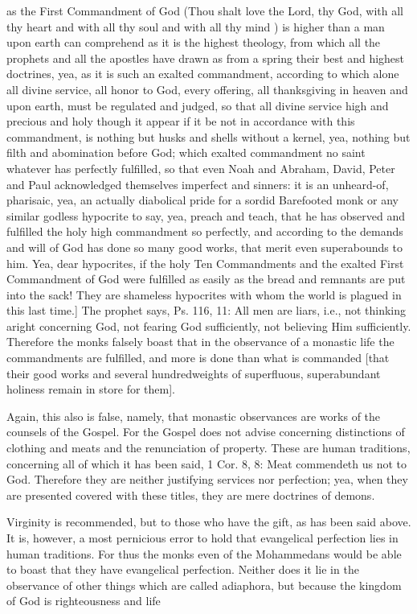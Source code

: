 as the First Commandment of God (Thou shalt love the Lord, thy God,
with all thy heart and with all thy soul and with all thy mind ) is
higher than a man upon earth can comprehend as it is the highest
theology, from which all the prophets and all the apostles have drawn
as from a spring their best and highest doctrines, yea, as it is such
an exalted commandment, according to which alone all divine service,
all honor to God, every offering, all thanksgiving in heaven and upon
earth, must be regulated and judged, so that all divine service high
and precious and holy though it appear if it be not in accordance
with this commandment, is nothing but husks and shells without a
kernel, yea, nothing but filth and abomination before God; which
exalted commandment no saint whatever has perfectly fulfilled, so
that even Noah and Abraham, David, Peter and Paul acknowledged
themselves imperfect and sinners: it is an unheard-of, pharisaic, yea,
an actually diabolical pride for a sordid Barefooted monk or any
similar godless hypocrite to say, yea, preach and teach, that he has
observed and fulfilled the holy high commandment so perfectly, and
according to the demands and will of God has done so many good works,
that merit even superabounds to him.  Yea, dear hypocrites, if the
holy Ten Commandments and the exalted First Commandment of God were
fulfilled as easily as the bread and remnants are put into the sack!
They are shameless hypocrites with whom the world is plagued in this
last time.] The prophet says, Ps. 116, 11: All men are liars, i.e.,
not thinking aright concerning God, not fearing God sufficiently, not
believing Him sufficiently.  Therefore the monks falsely boast that
in the observance of a monastic life the commandments are fulfilled,
and more is done than what is commanded [that their good works and
several hundredweights of superfluous, superabundant holiness remain
in store for them].

Again, this also is false, namely, that monastic observances are
works of the counsels of the Gospel.  For the Gospel does not advise
concerning distinctions of clothing and meats and the renunciation of
property.  These are human traditions, concerning all of which it has
been said, 1 Cor. 8, 8: Meat commendeth us not to God.  Therefore
they are neither justifying services nor perfection; yea, when they
are presented covered with these titles, they are mere doctrines of
demons.

Virginity is recommended, but to those who have the gift, as has been
said above.  It is, however, a most pernicious error to hold that
evangelical perfection lies in human traditions.  For thus the monks
even of the Mohammedans would be able to boast that they have
evangelical perfection.  Neither does it lie in the observance of
other things which are called adiaphora, but because the kingdom of
God is righteousness and life

